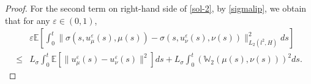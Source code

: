 \documentclass[11pt]{article}
\numberwithin{equation}{section}
\theoremstyle{plain}
\def\leq{\leqslant}
\begin{document}
\begin{proof}
 For the second term on right-hand side of \eqref{sol-2},
 by \eqref{sigmalip}, we obtain that for any $\varepsilon \in (0,1)$,
\begin{align} \label{sol-5}
       & \varepsilon
                \mathbb{E}
                     \left[ \int_0^t
                                     \| \sigma(s, u_\mu^\varepsilon (s), \mu(s) )
                                         - \sigma(s, u_\nu^\varepsilon (s), \nu(s) )
                                     \|_{L_{2}(l^2,H)}^2 ds
                     \right]  \nonumber \\
  \leq & L_\sigma
                \int_0^t \mathbb{E}
                               \left[
                                     \| u_\mu^\varepsilon (s)
                                         - u_\nu^\varepsilon (s)
                                     \|^2
                               \right] ds
         + L_\sigma
                  \int_0^t
                           \left( \mathbb{W}_2 \left( \mu(s), \nu(s) \right)
                           \right)^2
                    ds.
\end{align}


\end{proof}
\end{document}
